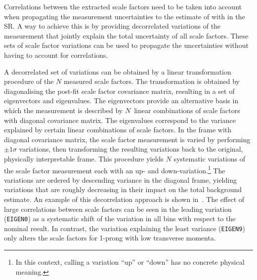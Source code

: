 Correlations between the extracted scale factors need to be taken into account
when propagating the measurement uncertainties to the estimate of \ttbar with
\faketauhadvis in the \hadhad SR. A way to achieve this is by providing
decorrelated variations of the measurement that jointly explain the total
uncertainty of all scale factors. These sets of scale factor variations can be
used to propagate the uncertainties without having to account for correlations.

A decorrelated set of variations can be obtained by a linear
transformation procedure of the $N$ measured scale factors. The
transformation is obtained by diagonalising the post-fit scale factor
covariance matrix, resulting in a set of eigenvectors and
eigenvalues. The eigenvectors provide an alternative basis in which
the measurement is described by $N$~linear combinations of scale
factors with diagonal covariance matrix. The eigenvalues correspond to
the variance explained by certain linear combinations of scale
factors. %
In the frame with diagonal covariance matrix, the scale factor
measurement is varied by performing $\pm 1 \sigma$ variations, then
transforming the resulting variations back to the original, physically
interpretable frame. This procedure yields $N$ systematic variations
of the scale factor measurement each with an up- and
down-variation.\footnote{In this context, calling a variation ``up''
  or ``down'' has no concrete physical meaning.} The variations are
ordered by descending variance in the diagonal frame, yielding
variations that are roughly decreasing in their impact on the total
\ttbarFakes background estimate. An example of this decorrelation
approach is shown in~. The effect of
large correlations between scale factors can be seen in the leading
variation (\texttt{EIGEN0}) as a systematic shift of the variation in
all bins with respect to the nominal result. In contrast, the
variation explaining the least variance (\texttt{EIGEN9}) only alters
the scale factors for 1-prong \faketauhadvis with low transverse
momenta.

